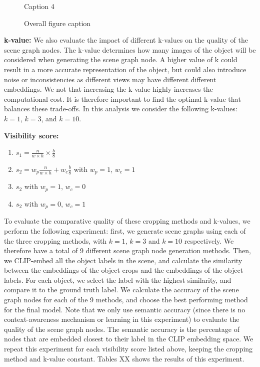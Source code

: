 \begin{figure}[h!]
\begin{minipage}[b]{0.1\textwidth}
        \caption{Caption 4}
    \end{minipage}
    \caption{Overall figure caption}
\end{figure}

\bigskip \noindent
\textbf{k-value:}
We also evaluate the impact of different k-values on the quality of the scene graph nodes. The k-value determines how many images of the object will be considered when generating the scene graph node. A higher value of k could result in a more accurate representation of the object, but could also introduce noise or inconsistencies as different views may have different different embeddings. We not that increasing the k-value highly increases the computational cost. It is therefore important to find the optimal k-value that balances these trade-offs. In this analysis we consider the following k-values: $k=1$, $k=3$, and $k=10$.

\bigskip \noindent
\textbf{Visibility score:}
\begin{enumerate}
    \item $s_1 = \frac{n}{w \times h} \times \frac{b}{8}$
    \item $s_2 = w_p \frac{n}{w \times h} + w_c \frac{b}{8}$ with $w_p = 1$, $w_c = 1$
    \item $s_2$ with $w_p = 1$, $w_c = 0$
    \item $s_2$ with $w_p = 0$, $w_c = 1$
\end{enumerate}

To evaluate the comparative quality of these cropping methods and k-values, we perform the following experiment: first, we generate scene graphs using each of the three cropping methods, with $k=1$, $k=3$ and $k=10$ respectively. We therefore have a total of 9 different scene graph node generation methods. Then, we CLIP-embed all the object labels in the scene, and calculate the similarity between the embeddings of the object crops and the embeddings of the object labels. For each object, we select the label with the highest similarity, and compare it to the ground truth label. We calculate the accuracy of the scene graph nodes for each of the 9 methods, and choose the best performing method for the final model.  Note that we only use semantic accuracy (since there is no context-awareness mechanism or learning in this experiment) to evaluate the quality of the scene graph nodes. The semantic accuracy is the percentage of nodes that are embedded closest to their label in the CLIP embedding space. We repeat this experiment for each visibility score listed above, keeping the cropping method and k-value constant. Tables XX shows the results of this experiment.

